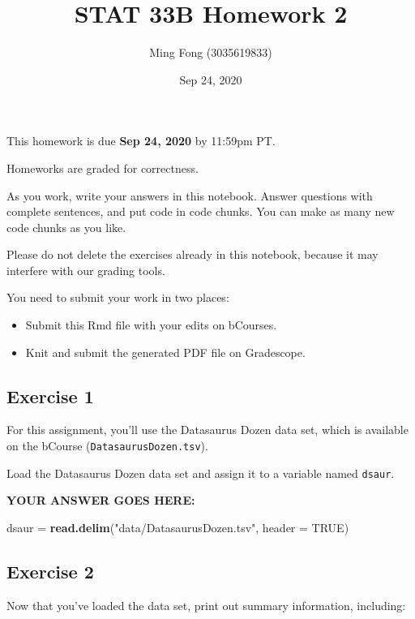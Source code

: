 \documentclass[
]{article}
\title{STAT 33B Homework 2}
\author{Ming Fong (3035619833)}
\date{Sep 24, 2020}
\newenvironment{Shaded}{\begin{snugshade}}{\end{snugshade}}
\newcommand{\DataTypeTok}[1]{\textcolor[rgb]{0.13,0.29,0.53}{#1}}
\newcommand{\KeywordTok}[1]{\textcolor[rgb]{0.13,0.29,0.53}{\textbf{#1}}}
\newcommand{\NormalTok}[1]{#1}
\newcommand{\OtherTok}[1]{\textcolor[rgb]{0.56,0.35,0.01}{#1}}
\newcommand{\StringTok}[1]{\textcolor[rgb]{0.31,0.60,0.02}{#1}}
\providecommand{\tightlist}{%
  \setlength{\itemsep}{0pt}\setlength{\parskip}{0pt}}
\begin{document}
\maketitle

This homework is due \textbf{Sep 24, 2020} by 11:59pm PT.

Homeworks are graded for correctness.

As you work, write your answers in this notebook. Answer questions with
complete sentences, and put code in code chunks. You can make as many
new code chunks as you like.

Please do not delete the exercises already in this notebook, because it
may interfere with our grading tools.

You need to submit your work in two places:

\begin{itemize}
\tightlist
\item
  Submit this Rmd file with your edits on bCourses.
\item
  Knit and submit the generated PDF file on Gradescope.
\end{itemize}

\hypertarget{exercise-1}{%
\subsection{Exercise 1}\label{exercise-1}}

For this assignment, you'll use the Datasaurus Dozen data set, which is
available on the bCourse (\texttt{DatasaurusDozen.tsv}).

Load the Datasaurus Dozen data set and assign it to a variable named
\texttt{dsaur}.

\textbf{YOUR ANSWER GOES HERE:}

\begin{Shaded}
\begin{Highlighting}[]
\NormalTok{dsaur =}\StringTok{ }\KeywordTok{read.delim}\NormalTok{(}\StringTok{"data/DatasaurusDozen.tsv"}\NormalTok{, }\DataTypeTok{header =} \OtherTok{TRUE}\NormalTok{)}
\end{Highlighting}
\end{Shaded}

\hypertarget{exercise-2}{%
\subsection{Exercise 2}\label{exercise-2}}

Now that you've loaded the data set, print out summary information,
including:
\end{document}
